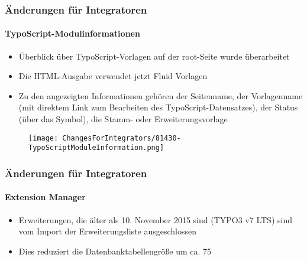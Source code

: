 \begin{frame}[fragile]
	\frametitle{Änderungen für Integratoren}
	\framesubtitle{TypoScript-Modulinformationen}

	\begin{itemize}
		\item Überblick über TypoScript-Vorlagen auf der root-Seite wurde überarbeitet
		\item Die HTML-Ausgabe verwendet jetzt Fluid Vorlagen
		\item Zu den angezeigten Informationen gehören der Seitenname, der Vorlagenname 
			 (mit direktem Link zum Bearbeiten des TypoScript-Datensatzes), der Status 
			 (über das Symbol), die Stamm- oder Erweiterungsvorlage

	\end{itemize}

	\begin{figure}
		\texttt{[image: ChangesForIntegrators/81430-TypoScriptModuleInformation.png]}
	\end{figure}

\end{frame}


\begin{frame}[fragile]
	\frametitle{Änderungen für Integratoren}
	\framesubtitle{Extension Manager}

	\begin{itemize}
		\item Erweiterungen, die älter als 10. November 2015 sind (TYPO3 v7 LTS) sind vom
			Import der Erweiterungsliste ausgeschlossen
		\item Dies reduziert die Datenbanktabellengröße um ca. 75%
	\end{itemize}

\end{frame}


